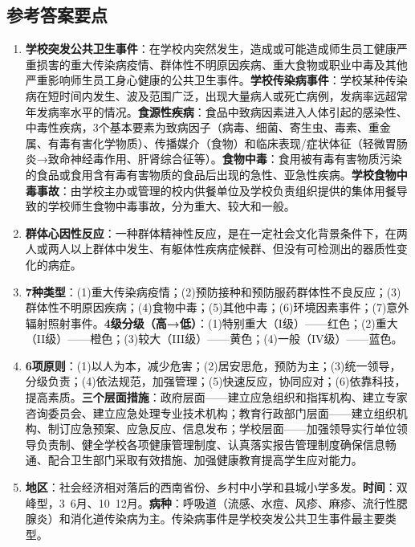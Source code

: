 \subsection*{参考答案要点}

\begin{enumerate}[leftmargin=*, itemsep=5pt]
    \item \textbf{学校突发公共卫生事件}：在学校内突然发生，造成或可能造成师生员工健康严重损害的重大传染病疫情、群体性不明原因疾病、重大食物或职业中毒及其他严重影响师生员工身心健康的公共卫生事件。\textbf{学校传染病事件}：学校某种传染病在短时间内发生、波及范围广泛，出现大量病人或死亡病例，发病率远超常年发病率水平的情况。\textbf{食源性疾病}：食品中致病因素进入人体引起的感染性、中毒性疾病，3个基本要素为致病因子（病毒、细菌、寄生虫、毒素、重金属、有毒有害化学物质）、传播媒介（食物）和临床表现/症状体征（轻微胃肠炎→致命神经毒作用、肝肾综合征等）。\textbf{食物中毒}：食用被有毒有害物质污染的食品或食用含有毒有害物质的食品后出现的急性、亚急性疾病。\textbf{学校食物中毒事故}：由学校主办或管理的校内供餐单位及学校负责组织提供的集体用餐导致的学校师生食物中毒事故，分为重大、较大和一般。

    \item \textbf{群体心因性反应}：一种群体精神性反应，是在一定社会文化背景条件下，在两人或两人以上群体中发生、有躯体性疾病症候群、但没有可检测出的器质性变化的病症。

    \item \textbf{7种类型}：(1)重大传染病疫情；(2)预防接种和预防服药群体性不良反应；(3)群体性不明原因疾病；(4)食物中毒；(5)其他中毒；(6)环境因素事件；(7)意外辐射照射事件。\textbf{4级分级（高→低）}：(1)特别重大（I级）——红色；(2)重大（II级）——橙色；(3)较大（III级）——黄色；(4)一般（IV级）——蓝色。

    \item \textbf{6项原则}：(1)以人为本，减少危害；(2)居安思危，预防为主；(3)统一领导，分级负责；(4)依法规范，加强管理；(5)快速反应，协同应对；(6)依靠科技，提高素质。\textbf{三个层面措施}：政府层面——建立应急组织和指挥机构、建立专家咨询委员会、建立应急处理专业技术机构；教育行政部门层面——建立组织机构、制订应急预案、应急反应、信息发布；学校层面——加强领导实行单位领导负责制、健全学校各项健康管理制度、认真落实报告管理制度确保信息畅通、配合卫生部门采取有效措施、加强健康教育提高学生应对能力。

    \item \textbf{地区}：社会经济相对落后的西南省份、乡村中小学和县城小学多发。\textbf{时间}：双峰型，3~6月、10~12月。\textbf{病种}：呼吸道（流感、水痘、风疹、麻疹、流行性腮腺炎）和消化道传染病为主。传染病事件是学校突发公共卫生事件最主要类型。


\end{enumerate}
